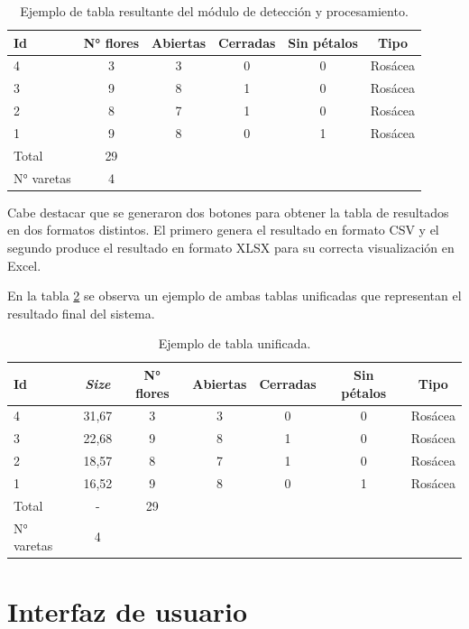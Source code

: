 \begin{table}[h]
	\centering
	\caption{Ejemplo de tabla resultante del módulo de detección y procesamiento.}
	\begin{tabular}{l c c c c c}    
		\toprule
		\textbf{Id} & \textbf{N° flores} & \textbf{Abiertas} & \textbf{Cerradas} & \textbf{Sin pétalos} & \textbf{Tipo} \\
		\midrule
		4    &  3 & 3 & 0 & 0 & Rosácea\\
		3    &  9 & 8 & 1 & 0 & Rosácea\\
		2    &  8 & 7 & 1 & 0 & Rosácea\\
		1    &  9 & 8 & 0 & 1 & Rosácea\\
		Total & 29\\
		N° varetas & 4	\\
		\bottomrule
		\hline
	\end{tabular}
	\label{tab:TablaResultados2}
\end{table} 

Cabe destacar que se generaron dos botones para obtener la tabla de resultados en dos formatos distintos. El primero genera el resultado en formato CSV y el segundo produce el resultado en formato XLSX para su correcta visualización en Excel. 

En la tabla \ref{tab:TablaResultados3} se observa un ejemplo de ambas tablas unificadas que representan el resultado final del sistema.

\begin{table}[h]
	\centering
	\caption{Ejemplo de tabla unificada.}
	\begin{tabular}{l c c c c c c}    
		\toprule
		\textbf{Id} &  \textbf{\textit{Size}} & \textbf{N° flores} & \textbf{Abiertas} & \textbf{Cerradas} & \textbf{Sin pétalos} & \textbf{Tipo} \\
		\midrule
		4   & 31,67 &  3 & 3 & 0 & 0 & Rosácea\\
		3   & 22,68 &  9 & 8 & 1 & 0 & Rosácea\\
		2   & 18,57 &  8 & 7 & 1 & 0 & Rosácea\\
		1   & 16,52 &  9 & 8 & 0 & 1 & Rosácea\\
		Total & - & 29\\
		N° varetas & 4	\\	
		\bottomrule
		\hline
	\end{tabular}
	\label{tab:TablaResultados3}
\end{table}


\section{Interfaz de usuario}

